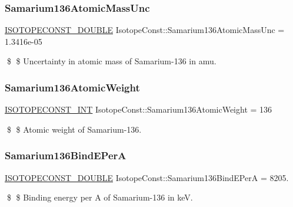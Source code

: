 \subsubsection{\texorpdfstring{Samarium136\+Atomic\+Mass\+Unc}{Samarium136AtomicMassUnc}}
{\footnotesize\ttfamily \mbox{\hyperlink{group___isotope_const-_macros_ga8f45a7272ce02c0b4c65c44636ed719a}{I\+S\+O\+T\+O\+P\+E\+C\+O\+N\+S\+T\+\_\+\+D\+O\+U\+B\+LE}} Isotope\+Const\+::\+Samarium136\+Atomic\+Mass\+Unc = 1.\+3416e-\/05}

\$ \$ Uncertainty in atomic mass of Samarium-\/136 in amu. \mbox{\label{group___isotope_const-_samarium-_sm136_ga1b99898729f7b67308f06d3e1830eff3}} 
\subsubsection{\texorpdfstring{Samarium136\+Atomic\+Weight}{Samarium136AtomicWeight}}
{\footnotesize\ttfamily \mbox{\hyperlink{group___isotope_const-_macros_ga5f18360b3e99483a35c32d789e62621c}{I\+S\+O\+T\+O\+P\+E\+C\+O\+N\+S\+T\+\_\+\+I\+NT}} Isotope\+Const\+::\+Samarium136\+Atomic\+Weight = 136}

\$ \$ Atomic weight of Samarium-\/136. \mbox{\label{group___isotope_const-_samarium-_sm136_ga7c250a05d19349e5df0ee770be379e0b}} 
\subsubsection{\texorpdfstring{Samarium136\+Bind\+E\+PerA}{Samarium136BindEPerA}}
{\footnotesize\ttfamily \mbox{\hyperlink{group___isotope_const-_macros_ga8f45a7272ce02c0b4c65c44636ed719a}{I\+S\+O\+T\+O\+P\+E\+C\+O\+N\+S\+T\+\_\+\+D\+O\+U\+B\+LE}} Isotope\+Const\+::\+Samarium136\+Bind\+E\+PerA = 8205.}

\$ \$ Binding energy per A of Samarium-\/136 in keV. \mbox{\label{group___isotope_const-_samarium-_sm136_ga4d7214ed6e12894941b4e2ac8ece6b0f}} 

